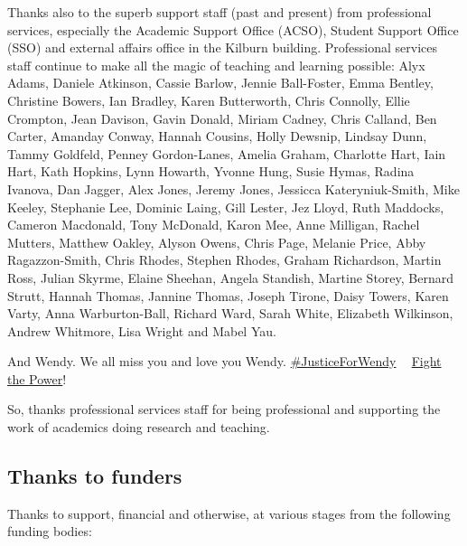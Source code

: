 \documentclass[
]{book}
\begin{document}
Thanks also to the superb support staff (past and present) from professional services, especially the Academic Support Office (ACSO), Student Support Office (SSO) and external affairs office in the Kilburn building. Professional services staff continue to make all the magic of teaching and learning possible: Alyx Adams, Daniele Atkinson, Cassie Barlow, Jennie Ball-Foster, Emma Bentley, Christine Bowers, Ian Bradley, Karen Butterworth, Chris Connolly, Ellie Crompton, Jean Davison, Gavin Donald, Miriam Cadney, Chris Calland, Ben Carter, Amanday Conway, Hannah Cousins, Holly Dewsnip, Lindsay Dunn, Tammy Goldfeld, Penney Gordon-Lanes, Amelia Graham, Charlotte Hart, Iain Hart, Kath Hopkins, Lynn Howarth, Yvonne Hung, Susie Hymas, Radina Ivanova, Dan Jagger, Alex Jones, Jeremy Jones, Jessicca Kateryniuk-Smith, Mike Keeley, Stephanie Lee, Dominic Laing, Gill Lester, Jez Lloyd, Ruth Maddocks, Cameron Macdonald, Tony McDonald, Karon Mee, Anne Milligan, Rachel Mutters, Matthew Oakley, Alyson Owens, Chris Page, Melanie Price, Abby Ragazzon-Smith, Chris Rhodes, Stephen Rhodes, Graham Richardson, Martin Ross, Julian Skyrme, Elaine Sheehan, Angela Standish, Martine Storey, Bernard Strutt, Hannah Thomas, Jannine Thomas, Joseph Tirone, Daisy Towers, Karen Varty, Anna Warburton-Ball, Richard Ward, Sarah White, Elizabeth Wilkinson, Andrew Whitmore, Lisa Wright and Mabel Yau.

And Wendy. We all miss you and love you Wendy. \href{https://www.justgiving.com/crowdfunding/byte-cafe}{\#JusticeForWendy} ✊🏽 \href{https://en.wikipedia.org/wiki/Fight_the_Power_(Public_Enemy_song)}{Fight the Power}! ✊🏽 \citep{fightthepower}

So, thanks professional services staff for being professional and supporting the work of academics doing research and teaching. 🙏

\hypertarget{funding}{%
\subsection{Thanks to funders}\label{funding}}

Thanks to support, financial and otherwise, at various stages from the following funding bodies:
\end{document}

